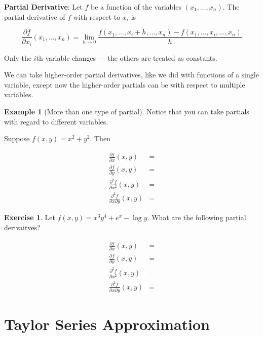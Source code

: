 \documentclass[
]{book}
\theoremstyle{definition}
\theoremstyle{definition}
\newtheorem{example}{Example}[chapter]
\theoremstyle{definition}
\newtheorem{exercise}{Exercise}[chapter]
\theoremstyle{remark}
\begin{document}
\textbf{Partial Derivative}: Let \(f\) be a function of the variables \((x_1,\ldots,x_n)\). The partial derivative of \(f\) with respect to \(x_i\) is

\[\frac{\partial f}{\partial x_i} (x_1,\ldots,x_n) = \lim\limits_{h\to 0} \frac{f(x_1,\ldots,x_i+h,\ldots,x_n)-f(x_1,\ldots,x_i,\ldots,x_n)}{h}\]

Only the \(i\)th variable changes --- the others are treated as constants.

We can take higher-order partial derivatives, like we did with functions of a single variable, except now the higher-order partials can be with respect to multiple variables.

\begin{example}[More than one type of partial]
\protect\hypertarget{exm:unnamed-chunk-18}{}{\label{exm:unnamed-chunk-18} {} }Notice that you can take partials with regard to different variables.

Suppose \(f(x,y)=x^2+y^2\). Then

\begin{align*}
\frac{\partial f}{\partial x}(x,y) &=\\
\frac{\partial f}{\partial y}(x,y) &=\\
\frac{\partial^2 f}{\partial x^2}(x,y) &=\\
\frac{\partial^2 f}{\partial x \partial y}(x,y) &=
\end{align*}
\end{example}

\begin{exercise}
\protect\hypertarget{exr:unnamed-chunk-19}{}{\label{exr:unnamed-chunk-19} }Let \(f(x,y)=x^3 y^4 +e^x -\log y\). What are the following partial derivaitves?

\begin{align*}
\frac{\partial f}{\partial x}(x,y) &=\\
\frac{\partial f}{\partial y}(x,y) &=\\
\frac{\partial^2 f}{\partial x^2}(x,y) &=\\
\frac{\partial^2 f}{\partial x \partial y}(x,y) &= 
\end{align*}
\end{exercise}

\hypertarget{taylorapprox}{%
\section{Taylor Series Approximation}\label{taylorapprox}}
\end{document}
